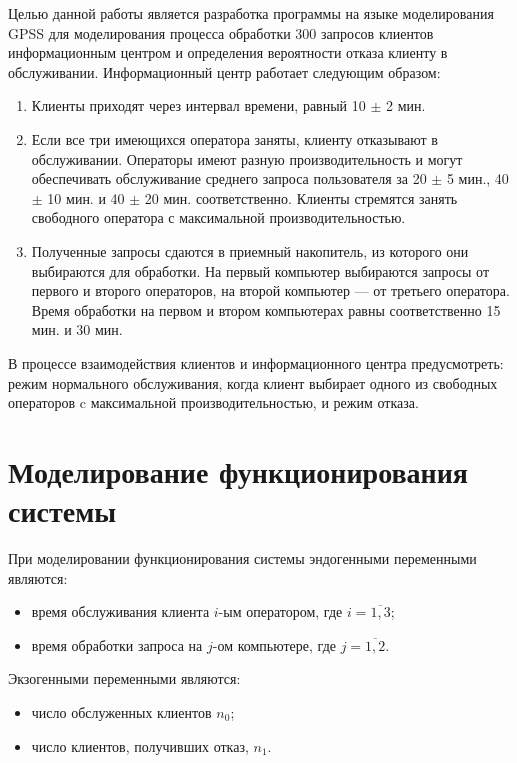 
Целью данной работы является разработка программы на языке моделирования GPSS для моделирования процесса обработки 300 запросов клиентов информационным центром и определения вероятности отказа клиенту в обслуживании. Информационный центр работает следующим образом:

\begin{enumerate}
	\item Клиенты приходят через интервал времени, равный 10 $\pm$ 2 мин.
	\item Если все три имеющихся оператора заняты, клиенту отказывают в обслуживании. Операторы имеют разную производительность и могут обеспечивать обслуживание среднего запроса пользователя за 20 $\pm$ 5 мин., 40 $\pm$ 10 мин. и 40 $\pm$ 20 мин. соответственно. Клиенты стремятся занять свободного оператора с максимальной производительностью.
	\item Полученные запросы сдаются в приемный накопитель, из которого они выбираются для обработки. На первый компьютер выбираются запросы от первого и второго операторов, на второй компьютер --- от третьего оператора. Время обработки на первом и втором компьютерах равны соответственно 15 мин. и 30 мин.
\end{enumerate}

В процессе взаимодействия клиентов и информационного центра предусмотреть: режим нормального обслуживания, когда клиент выбирает одного из свободных операторов c максимальной производительностью, и режим отказа.
 
\section*{Моделирование функционирования системы}

При моделировании функционирования системы эндогенными переменными являются:

\begin{itemize}
	\item время обслуживания клиента $i$-ым оператором, где $i = \overline{1, 3}$;	
	\item время обработки запроса на $j$-ом компьютере, где $j = \overline{1, 2}$.
\end{itemize}

\clearpage

Экзогенными переменными являются:

\begin{itemize}
	\item число обслуженных клиентов $n_{0}$;
	\item число клиентов, получивших отказ, $n_{1}$.
\end{itemize}

